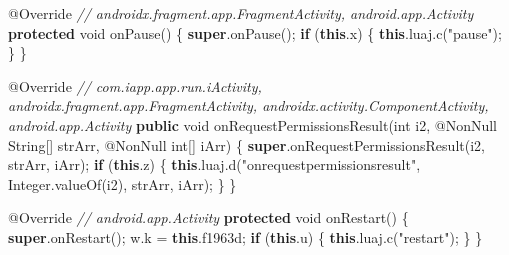 \documentclass[
]{article}
\newenvironment{Shaded}{}{}
\newcommand{\AttributeTok}[1]{\textcolor[rgb]{0.49,0.56,0.16}{#1}}
\newcommand{\BuiltInTok}[1]{\textcolor[rgb]{0.00,0.50,0.00}{#1}}
\newcommand{\CommentTok}[1]{\textcolor[rgb]{0.38,0.63,0.69}{\textit{#1}}}
\newcommand{\ControlFlowTok}[1]{\textcolor[rgb]{0.00,0.44,0.13}{\textbf{#1}}}
\newcommand{\DataTypeTok}[1]{\textcolor[rgb]{0.56,0.13,0.00}{#1}}
\newcommand{\FunctionTok}[1]{\textcolor[rgb]{0.02,0.16,0.49}{#1}}
\newcommand{\KeywordTok}[1]{\textcolor[rgb]{0.00,0.44,0.13}{\textbf{#1}}}
\newcommand{\NormalTok}[1]{#1}
\newcommand{\OperatorTok}[1]{\textcolor[rgb]{0.40,0.40,0.40}{#1}}
\newcommand{\StringTok}[1]{\textcolor[rgb]{0.25,0.44,0.63}{#1}}
\begin{document}
\begin{Shaded}
\begin{Highlighting}[]
    \AttributeTok{@Override} \CommentTok{// androidx.fragment.app.FragmentActivity, android.app.Activity}
    \KeywordTok{protected} \DataTypeTok{void} \FunctionTok{onPause}\OperatorTok{()} \OperatorTok{\{}
        \KeywordTok{super}\OperatorTok{.}\FunctionTok{onPause}\OperatorTok{();}
        \ControlFlowTok{if} \OperatorTok{(}\KeywordTok{this}\OperatorTok{.}\FunctionTok{x}\OperatorTok{)} \OperatorTok{\{}
            \KeywordTok{this}\OperatorTok{.}\FunctionTok{luaj}\OperatorTok{.}\FunctionTok{c}\OperatorTok{(}\StringTok{"pause"}\OperatorTok{);}
        \OperatorTok{\}}
    \OperatorTok{\}}

    \AttributeTok{@Override} \CommentTok{// com.iapp.app.run.iActivity, androidx.fragment.app.FragmentActivity, androidx.activity.ComponentActivity, android.app.Activity}
    \KeywordTok{public} \DataTypeTok{void} \FunctionTok{onRequestPermissionsResult}\OperatorTok{(}\DataTypeTok{int}\NormalTok{ i2}\OperatorTok{,} \AttributeTok{@NonNull} \BuiltInTok{String}\OperatorTok{[]}\NormalTok{ strArr}\OperatorTok{,} \AttributeTok{@NonNull} \DataTypeTok{int}\OperatorTok{[]}\NormalTok{ iArr}\OperatorTok{)} \OperatorTok{\{}
        \KeywordTok{super}\OperatorTok{.}\FunctionTok{onRequestPermissionsResult}\OperatorTok{(}\NormalTok{i2}\OperatorTok{,}\NormalTok{ strArr}\OperatorTok{,}\NormalTok{ iArr}\OperatorTok{);}
        \ControlFlowTok{if} \OperatorTok{(}\KeywordTok{this}\OperatorTok{.}\FunctionTok{z}\OperatorTok{)} \OperatorTok{\{}
            \KeywordTok{this}\OperatorTok{.}\FunctionTok{luaj}\OperatorTok{.}\FunctionTok{d}\OperatorTok{(}\StringTok{"onrequestpermissionsresult"}\OperatorTok{,} \BuiltInTok{Integer}\OperatorTok{.}\FunctionTok{valueOf}\OperatorTok{(}\NormalTok{i2}\OperatorTok{),}\NormalTok{ strArr}\OperatorTok{,}\NormalTok{ iArr}\OperatorTok{);}
        \OperatorTok{\}}
    \OperatorTok{\}}

    \AttributeTok{@Override} \CommentTok{// android.app.Activity}
    \KeywordTok{protected} \DataTypeTok{void} \FunctionTok{onRestart}\OperatorTok{()} \OperatorTok{\{}
        \KeywordTok{super}\OperatorTok{.}\FunctionTok{onRestart}\OperatorTok{();}
\NormalTok{        w}\OperatorTok{.}\FunctionTok{k} \OperatorTok{=} \KeywordTok{this}\OperatorTok{.}\FunctionTok{f1963d}\OperatorTok{;}
        \ControlFlowTok{if} \OperatorTok{(}\KeywordTok{this}\OperatorTok{.}\FunctionTok{u}\OperatorTok{)} \OperatorTok{\{}
            \KeywordTok{this}\OperatorTok{.}\FunctionTok{luaj}\OperatorTok{.}\FunctionTok{c}\OperatorTok{(}\StringTok{"restart"}\OperatorTok{);}
        \OperatorTok{\}}
    \OperatorTok{\}}


\end{Highlighting}
\end{Shaded}
\end{document}
